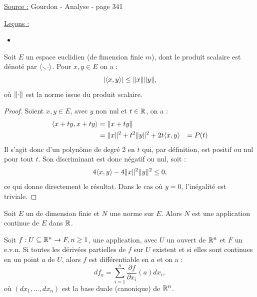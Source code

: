 
\newcommand{\Mnr}{M_n(\R)}
\newcommand{\So}{\text{SO}(n,\R)}
\newcommand{\Sl}{\text{SL}(n,\R)}

\pagestyle{fancy}

\fancyhead[C]{}
\fancyhead[R]{}



\underline{Source :} Gourdon - Analyse - page 341

\underline{Leçons :}
\begin{itemize}
\item 
\end{itemize}

\begin{lem}
Soit $E$ un espace euclidien (de fimension finie $m$), dont le produit scalaire est dénoté par $\langle\cdot, \cdot\rangle$.
Pour $x, y \in E$ on a :
\[ \lvert\langle x,y\rangle\rvert \leq \lVert x\rVert \lVert y\rVert , \]
où $\lVert\cdot\rVert$ est la norme issue du produit scalaire.
\end{lem}

\begin{proof}
Soient $x, y \in E$, avec $y$ non nul et $t \in \mathbb{R}$, on a :
\begin{align*}
\langle x+ty, x+ty\rangle & = \lVert x+ty\rVert \\
& = \lVert x\rVert^2 + t^2 \lVert y\rVert^2 + 2t \langle x,y\rangle
& = P(t)
\end{align*}
Il s'agit donc d'un polynôme de degré 2 en $t$ qui, par définition, est positif ou nul pour tout $t$. Son discriminant est donc négatif ou nul,
soit :
\[ 4 \langle x,y\rangle - 4 \lVert x\rVert^2 \lVert y\rVert^2 \leq 0 , \]
ce qui donne directement le résultat. Dans le cas où $y=0$, l'inégalité est triviale.
\end{proof}

\begin{lem}
Soit $E$ un \Kev de dimension finie et $N$ une norme sur $E$. Alors $N$ est une application continue de $E$ dans $\mathbb{R}$.
\end{lem}

\begin{thm}
Soit $f : U \subseteq \mathbb{R}^n \to F, n \geq 1$, une application, avec $U$ un ouvert de $\mathbb{R}^n$ et $F$ un e.v.n.
Si toutes les dérivées partielles de $f$ sur $U$ existent et si elles sont continues en un point $a$ de $U$, 
alors $f$ est différentiable en $a$ et on a :
\[ df_a = \sum_{i=1}^n \dfrac{\partial f}{\partial x_i} (a) dx_i , \]
où $(dx_1, \dots, dx_n)$ est la base duale (canonique) de $\mathbb{R}^n$.
\end{thm}

